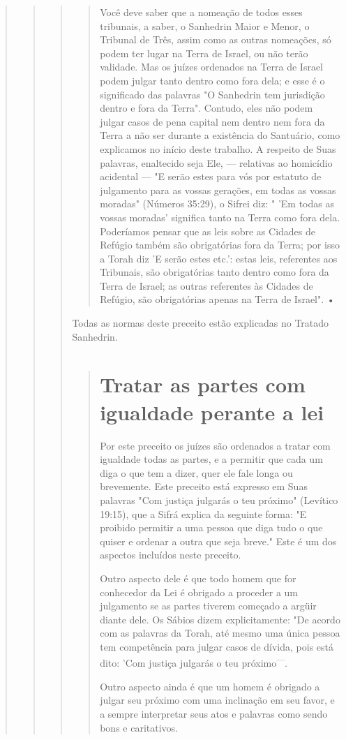 \begin{quote}
\begin{quote}
\begin{quote}
\begin{quote}
Você deve saber que a nomeação de todos esses tribunais, a saber, o
Sanhedrin Maior e Menor, o Tribunal de Três, assim como as outras
nomea­ções, só podem ter lugar na Terra de Israel, ou não terão
validade. Mas os juízes ordenados na Terra de Israel podem julgar tanto
dentro como fora dela; e esse é o significado das palavras "O Sanhedrin
tem jurisdição dentro e fora da Ter­ra". Contudo, eles não podem julgar
casos de pena capital nem dentro nem fora da Terra a não ser durante a
existência do Santuário, como explicamos no início deste trabalho. A
respeito de Suas palavras, enaltecido seja Ele, --- relati­vas ao
homicídio acidental --- "E serão estes para vós por estatuto de
julgamen­to para as vossas gerações, em todas as vossas moradas"
(Números 35:29), o Sifrei diz: " 'Em todas as vossas moradas' significa
tanto na Terra como fora dela. Poderíamos pensar que as leis sobre as
Cidades de Refúgio também são obrigatórias fora da Terra; por isso a
Torah diz 'E serão estes etc.': estas leis, referentes aos Tribunais,
são obrigatórias tanto dentro como fora da Terra de Israel; as outras
referentes às Cidades de Refúgio, são obrigatórias apenas na Terra de
Israel". •
\end{quote}

Todas as normas deste preceito estão explicadas no Tratado Sanhedrin.

\begin{quote}
\section{Tratar as partes com igualdade perante a lei}

Por este preceito os juízes são ordenados a tratar com igualdade to­das
as partes, e a permitir que cada um diga o que tem a dizer, quer ele
fale longa ou brevemente. Este preceito está expresso em Suas palavras
"Com justi­ça julgarás o teu próximo" (Levítico 19:15), que a Sifrá
explica da seguinte for­ma: "E proibido permitir a uma pessoa que diga
tudo o que quiser e ordenar a outra que seja breve." Este é um dos
aspectos incluídos neste preceito.

Outro aspecto dele é que todo homem que for conhecedor da Lei é obrigado
a proceder a um julgamento se as partes tiverem começado a argüir diante
dele. Os Sábios dizem explicitamente: "De acordo com as palavras da
Torah, até mesmo uma única pessoa tem competência para julgar casos de
dívi­da, pois está dito: 'Com justiça julgarás o teu
próximo\textsuperscript{---}.

Outro aspecto ainda é que um homem é obrigado a julgar seu próxi­mo com
uma inclinação em seu favor, e a sempre interpretar seus atos e
pala­vras como sendo bons e caritativos.
\end{quote}


\end{quote}
\end{quote}
\end{quote}
